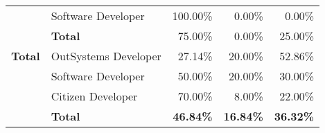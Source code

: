 \begin{table}[tb]
\begin{tabular}{@{}llrrr@{}}
                              & Software Developer   & 100.00\%                                                          & 0.00\%                                                                  & 0.00\%                                                        \\
                              & \textbf{Total}       & 75.00\%                                                           & 0.00\%                                                                  & 25.00\%                                                       \\ \midrule
    \rowcolor[HTML]{EFEFEF} 
    \textbf{Total}            & OutSystems Developer & 27.14\%                                                           & 20.00\%                                                                 & 52.86\%                                                       \\
    \rowcolor[HTML]{EFEFEF} 
                              & Software Developer   & 50.00\%                                                           & 20.00\%                                                                 & 30.00\%                                                       \\
    \rowcolor[HTML]{EFEFEF} 
                              & Citizen Developer    & 70.00\%                                                           & 8.00\%                                                                  & 22.00\%                                                       \\
    \rowcolor[HTML]{EFEFEF} 
                              & \textbf{Total}       & \textbf{46.84\%}                                                  & \textbf{16.84\%}                                                        & \textbf{36.32\%}                                              \\ \bottomrule
    \end{tabular}
    \end{table}

